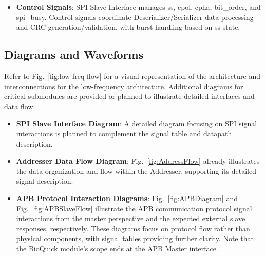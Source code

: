 \begin{itemize}[nosep]
    \item \textbf{Control Signals}: SPI Slave Interface manages ss, cpol, cpha, bit\_order, and spi\_busy. Control signals coordinate Deserializer/Serializer data processing and CRC generation/validation, with burst handling based on ss state.
\end{itemize}

\subsection{Diagrams and Waveforms}

Refer to Fig.~\ref{fig:low-freq-flow} for a visual representation of the architecture and interconnections for the low-frequency architecture. Additional diagrams for critical submodules are provided or planned to illustrate detailed interfaces and data flow.

\begin{itemize}[nosep]
    \item \textbf{SPI Slave Interface Diagram}: A detailed diagram focusing on SPI signal interactions is planned to complement the signal table and datapath description.
    \item \textbf{Addresser Data Flow Diagram}: Fig.~\ref{fig:AddressFlow} already illustrates the data organization and flow within the Addresser, supporting its detailed signal description.
    \item \textbf{APB Protocol Interaction Diagrams}: Fig.~\ref{fig:APBDiagram} and Fig.~\ref{fig:APBSlaveFlow} illustrate the APB communication protocol signal interactions from the master perspective and the expected external slave responses, respectively. These diagrams focus on protocol flow rather than physical components, with signal tables providing further clarity. Note that the BioQuick module's scope ends at the APB Master interface.
\end{itemize}



